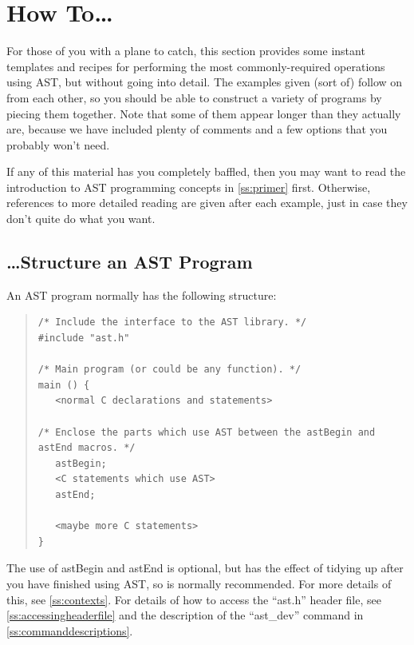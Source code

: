 \documentclass[twoside,11pt]{article}
\newcommand{\htmlref}[2]{#1}
\newcommand{\appref}[1]{Appendix~\ref{#1}}
\newcommand{\secref}[1]{\S\ref{#1}}
\renewcommand{\appref}[1]{\ref{#1}}
\renewcommand{\secref}[1]{\ref{#1}}
\begin{document}
\cleardoublepage
\section{\label{ss:howto}How To\ldots}

For those of you with a plane to catch, this section provides some
instant templates and recipes for performing the most
commonly-required operations using AST, but without going into
detail. The examples given (sort of) follow on from each other, so you
should be able to construct a variety of programs by piecing them
together.  Note that some of them appear longer than they actually
are, because we have included plenty of comments and a few options
that you probably won't need.

If any of this material has you completely baffled, then you may want
to read the introduction to AST programming concepts in
\secref{ss:primer} first. Otherwise, references to more detailed
reading are given after each example, just in case they don't quite do
what you want.

\subsection{\ldots Structure an AST Program}

An AST program normally has the following structure:

\begin{quote}
\small
\begin{verbatim}
/* Include the interface to the AST library. */
#include "ast.h"

/* Main program (or could be any function). */
main () {
   <normal C declarations and statements>

/* Enclose the parts which use AST between the astBegin and astEnd macros. */
   astBegin;
   <C statements which use AST>
   astEnd;

   <maybe more C statements>
}
\end{verbatim}
\normalsize
\end{quote}

The use of \htmlref{astBegin}{astBegin} and \htmlref{astEnd}{astEnd} is optional, but has the effect of
tidying up after you have finished using AST, so is normally
recommended. For more details of this, see \secref{ss:contexts}. For
details of how to access the ``ast.h'' header file, see
\secref{ss:accessingheaderfile} and the description of the
``\htmlref{ast\_dev}{ast_dev}'' command in \appref{ss:commanddescriptions}.
\end{document}
